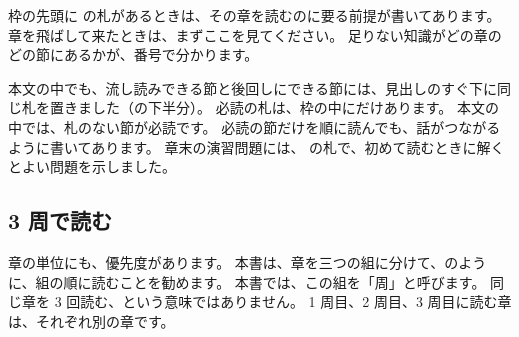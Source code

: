 枠の先頭に \rgpre の札があるときは、その章を読むのに要る前提が書いてあります。
章を飛ばして来たときは、まずここを見てください。
足りない知識がどの章のどの節にあるかが、番号で分かります。

本文の中でも、流し読みできる節と後回しにできる節には、見出しのすぐ下に同じ札を置きました（の下半分）。
必読の札は、枠の中にだけあります。
本文の中では、札のない節が必読です。
必読の節だけを順に読んでも、話がつながるように書いてあります。
章末の演習問題には、 の札で、初めて読むときに解くとよい問題を示しました。

\subsection*{3 周で読む}

章の単位にも、優先度があります。
本書は、章を三つの組に分けて、のように、組の順に読むことを勧めます。
本書では、この組を「周」と呼びます。
同じ章を 3 回読む、という意味ではありません。
1 周目、2 周目、3 周目に読む章は、それぞれ別の章です。

